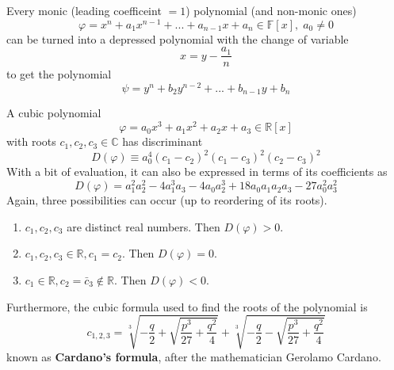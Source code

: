   \begin{proposition}
    Every monic (leading coefficeint $=1$) polynomial (and non-monic ones) 
    \begin{equation}
      \varphi = x^n + a_1 x^{n-1} + ... + a_{n-1} x + a_n \in \mathbb{F}[x], \; a_0 \neq 0
    \end{equation}
    can be turned into a depressed polynomial with the change of variable
    \begin{equation}
      x = y - \frac{a_1}{n}
    \end{equation}
    to get the polynomial 
    \begin{equation}
      \psi = y^n + b_2 y^{n-2} + ... + b_{n-1} y + b_n
    \end{equation}
  \end{proposition}

  \begin{lemma}
    A cubic polynomial 
    \begin{equation}
      \varphi = a_0 x^3 + a_1 x^2 + a_2 x + a_3 \in \mathbb{R}[x]
    \end{equation}
    with roots $c_1, c_2, c_3 \in \mathbb{C}$ has discriminant
    \begin{equation}
      D(\varphi) \equiv a_0^4 (c_1 - c_2)^2 (c_1 - c_3)^2 (c_2 - c_3)^2
    \end{equation}
    With a bit of evaluation, it can also be expressed in terms of its coefficients as
    \begin{equation}
      D(\varphi) = a_1^2 a_2^2 - 4a_1^3 a_3 - 4a_0 a_2^3 + 18 a_0 a_1 a_2 a_3 - 27 a_0^2 a_3^2
    \end{equation}
    Again, three possibilities can occur (up to reordering of its roots). 
    \begin{enumerate}
        \item $c_1, c_2, c_3$ are distinct real numbers. Then $D(\varphi) > 0$. 
        \item $c_1, c_2, c_3 \in \mathbb{R}, c_1 = c_2$. Then $D(\varphi) = 0$. 
        \item $c_1 \in \mathbb{R}, c_2 = \bar{c}_3 \not\in \mathbb{R}$. Then $D(\varphi) < 0$. 
    \end{enumerate}
    Furthermore, the cubic formula used to find the roots of the polynomial is 
    \begin{equation}
      c_{1, 2, 3} = \sqrt[3]{-\frac{q}{2} + \sqrt{\frac{p^3}{27} + \frac{q^2}{4}}} + \sqrt[3]{-\frac{q}{2} - \sqrt{\frac{p^3}{27} + \frac{q^2}{4}}}
    \end{equation}
    known as \textbf{Cardano's formula}, after the mathematician Gerolamo Cardano. 
  \end{lemma}




